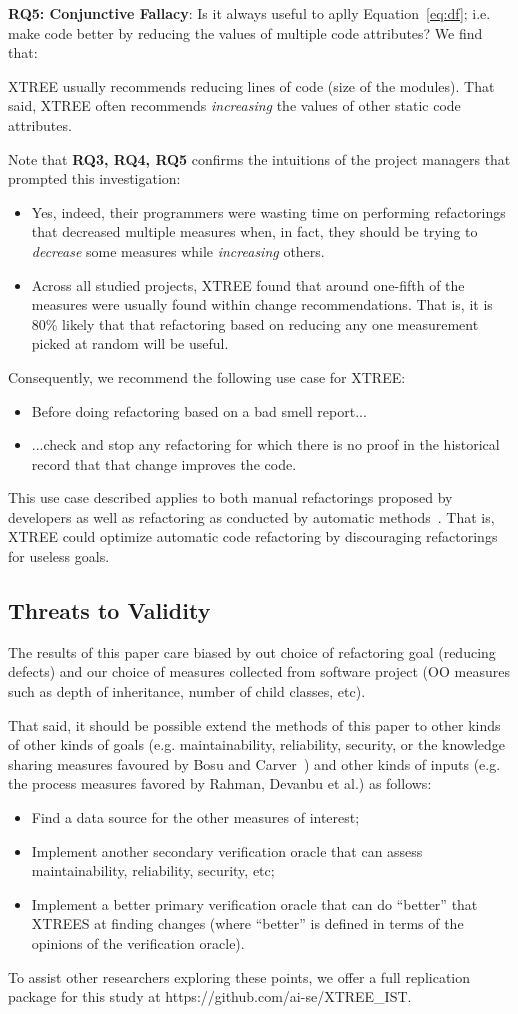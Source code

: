 \documentclass[twocolumn,5p]{elsarticle}
\newcommand{\bi}{\begin{itemize}[leftmargin=0.4cm]}
\newcommand{\ei}{\end{itemize}}
\newcommand{\eq}[1]{Equation~\ref{eq:#1}}
\theoremstyle{break}
\begin{document}
{\bf RQ5: Conjunctive Fallacy}:  
Is it always  useful  to aplly \eq{df}; i.e. make code better by   reducing the values of  multiple code attributes? We find that:
\begin{lesson}
XTREE usually recommends reducing lines of code (size of the modules).
That said,  XTREE often recommends {\em increasing} the values of other static code attributes.
\end{lesson} 
Note that {\bf RQ3, RQ4, RQ5} 
confirms the intuitions
of the project managers that prompted this investigation:
\bi
\item
Yes,  indeed, their programmers
were wasting time on   performing refactorings  that  decreased multiple measures when, in fact,
they should be trying to {\em decrease} some measures while {\em increasing} others.
\item
Across all studied projects, XTREE found that  around one-fifth  
  of the measures were usually found within  change recommendations. That is, it is 80\% likely that
  that refactoring based on reducing any one measurement picked at random will be useful.
\ei
Consequently, we  recommend the following use case for  XTREE:
\bi
\item Before doing  refactoring based on a bad smell report...
\item ...check and stop any refactoring   for which there is no proof
  in the historical record that that change improves the code.
\ei
This use case described  applies to both manual refactorings proposed by developers
as well as refactoring as conducted by automatic methods~\cite{mkaouer2015many}. That is, XTREE could optimize automatic
code refactoring by discouraging refactorings for useless goals.
 


\subsection{ Threats to Validity}
 
The results of this paper care biased by out choice of refactoring goal (reducing defects) and our choice
of measures collected from software project (OO measures such as
  depth of inheritance, number of child classes, etc).
  
  That said, it should be possible extend the methods of this paper to  other kinds of other kinds of goals (e.g. maintainability, reliability, security,
  or the knowledge sharing measures favoured by Bosu and Carver~\cite{bosu13}) and other kinds of inputs (e.g. the process measures favored by Rahman, Devanbu et al.\cite{Rahman2013})  as follows:
  \bi
  \item Find a data source for the other measures of interest;
  \item Implement another secondary verification oracle that can assess maintainability, reliability, security, etc;
\item Implement a better primary verification oracle that can do ``better'' that XTREES at finding changes (where ``better'' is defined in terms 
of the opinions of the verification oracle).
\ei
To assist other researchers exploring these points, we offer a full replication package for this study at  https://github.com/ai-se/XTREE\_IST.
\end{document}
